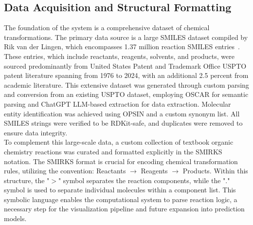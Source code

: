 \documentclass[12pt]{article}
\begin{document}
\subsection{Data Acquisition and Structural Formatting}
The foundation of the system is a comprehensive dataset of chemical transformations.
The primary data source is a large SMILES dataset compiled by Rik van der Lingen, which encompasses 1.37 million reaction SMILES entries~\cite{vanderlingen2025reaction}.
These entries, which include reactants, reagents, solvents, and products, were sourced predominantly from United States Patent and Trademark Office USPTO patent literature spanning from 1976 to 2024, with an additional 2.5 percent from academic literature.
This extensive dataset was generated through custom parsing and conversion from an existing USPTO dataset, employing OSCAR for semantic parsing and ChatGPT LLM-based extraction for data extraction.
Molecular entity identification was achieved using OPSIN and a custom synonym list.
All SMILES strings were verified to be RDKit-safe, and duplicates were removed to ensure data integrity.
\\
To complement this large-scale data, a custom collection of textbook organic chemistry reactions was curated and formatted explicitly in the SMIRKS notation.
The SMIRKS format is crucial for encoding chemical transformation rules, utilizing the convention: {Reactants $\rightarrow$ Reagents $\rightarrow$ Products}.
Within this structure, the "$>$" symbol separates the reaction components, while the "$.$" symbol is used to separate individual molecules within a component list.
This symbolic language enables the computational system to parse reaction logic, a necessary step for the visualization pipeline and future expansion into prediction models.
\end{document}
